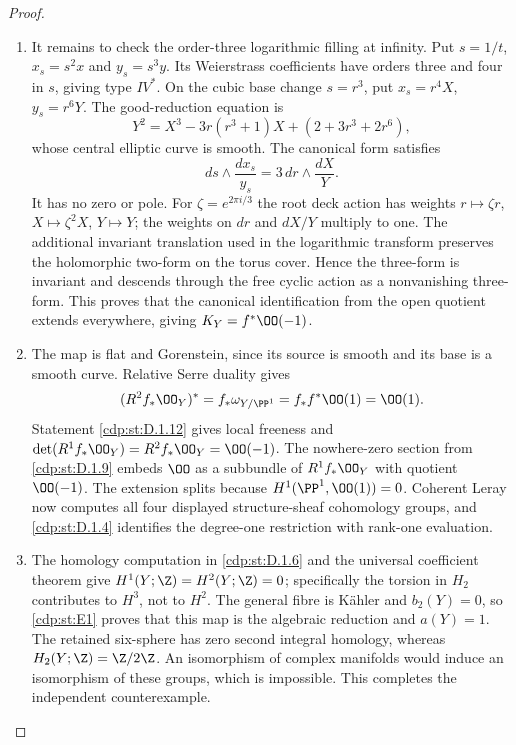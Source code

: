 \begin{proof}
\begin{enumerate}[label={$\langle1\rangle$\arabic*.},leftmargin=*]
\item It remains to check the order-three logarithmic filling at infinity.
Put $s=1/t$, $x_s=s^2x$ and $y_s=s^3y$. Its Weierstrass
coefficients have orders three and four in $s$, giving type $IV^*$.
On the cubic base change $s=r^3$, put
$x_s=r^4X$, $y_s=r^6Y$. The good-reduction equation is
\[
Y^2=X^3-3r(r^3+1)X+(2+3r^3+2r^6),
\]
whose central elliptic curve is smooth. The canonical form satisfies
\[
ds\wedge\frac{dx_s}{y_s}
=3\,dr\wedge\frac{dX}{Y}.
\]
It has no zero or pole. For $\zeta=e^{2\pi i/3}$ the root deck
action has weights $r\mapsto\zeta r$, $X\mapsto\zeta^2X$,
$Y\mapsto Y$; the weights on $dr$ and $dX/Y$ multiply to one.
The additional invariant translation used in the logarithmic
transform preserves the holomorphic two-form on the torus cover.
Hence the three-form is invariant and descends through the free
cyclic action as a nonvanishing three-form. This proves that the
canonical identification from the open quotient extends everywhere,
giving $K_Y=f^*\OO(-1)$.

\item The map is flat and Gorenstein, since its source is smooth and its
base is a smooth curve. Relative Serre duality gives
\[
(R^2f_*\OO_Y)^*=f_*\omega_{Y/\PP^1}
=f_*f^*\OO(1)=\OO(1).
\]
Statement \ref{cdp:st:D.1.12} gives local freeness and
$\det(R^1f_*\OO_Y)=R^2f_*\OO_Y=\OO(-1)$.
The nowhere-zero section from \ref{cdp:st:D.1.9} embeds $\OO$ as a subbundle
of $R^1f_*\OO_Y$ with quotient $\OO(-1)$. The extension splits
because $H^1(\PP^1,\OO(1))=0$. Coherent Leray now computes all
four displayed structure-sheaf cohomology groups, and \ref{cdp:st:D.1.4}
identifies the degree-one restriction with rank-one evaluation.

\item The homology computation in \ref{cdp:st:D.1.6} and the universal coefficient
theorem give $H^1(Y;\Z)=H^2(Y;\Z)=0$; specifically the torsion
in $H_2$ contributes to $H^3$, not to $H^2$.
The general fibre is K\"ahler and $b_2(Y)=0$, so \ref{cdp:st:E1} proves that
this map is the algebraic reduction and $a(Y)=1$.
The retained six-sphere has zero second integral homology, whereas
$H_2(Y;\Z)=\Z/2\Z$. An isomorphism of complex manifolds would
induce an isomorphism of these groups, which is impossible.
This completes the independent counterexample.

\end{enumerate}
\end{proof}
